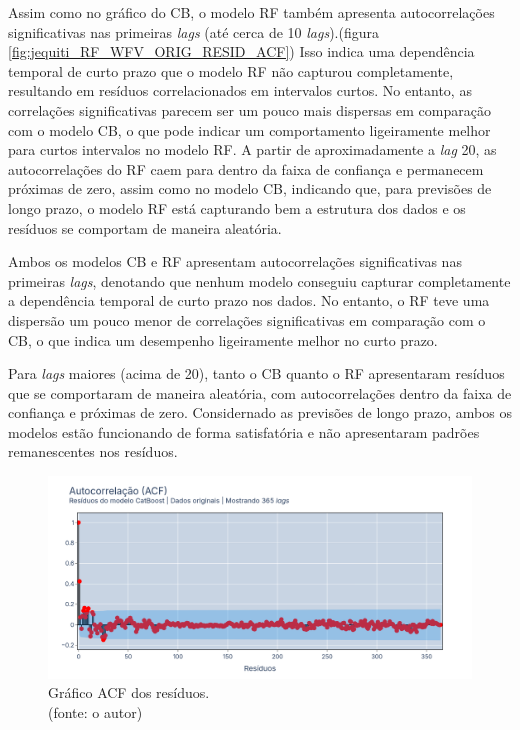 Assim como no gráfico do CB, o modelo RF também apresenta autocorrelações significativas nas primeiras \textit{lags} (até cerca de 10 \textit{lags}).(figura \ref{fig:jequiti_RF_WFV_ORIG_RESID_ACF}) Isso indica uma dependência temporal de curto prazo que o modelo RF não capturou completamente, resultando em resíduos correlacionados em intervalos curtos. No entanto, as correlações significativas parecem ser um pouco mais dispersas em comparação com o modelo CB, o que pode indicar um comportamento ligeiramente melhor para curtos intervalos no modelo RF. A partir de aproximadamente a \textit{lag} 20, as autocorrelações do RF caem para dentro da faixa de confiança e permanecem próximas de zero, assim como no modelo CB, indicando que, para previsões de longo prazo, o modelo RF está capturando bem a estrutura dos dados e os resíduos se comportam de maneira aleatória.

Ambos os modelos CB e RF apresentam autocorrelações significativas nas primeiras \textit{lags}, denotando que nenhum modelo conseguiu capturar completamente a dependência temporal de curto prazo nos dados. No entanto, o RF teve uma dispersão um pouco menor de correlações significativas em comparação com o CB, o que indica um desempenho ligeiramente melhor no curto prazo.

Para \textit{lags} maiores (acima de 20), tanto o CB quanto o RF apresentaram resíduos que se comportaram de maneira aleatória, com autocorrelações dentro da faixa de confiança e próximas de zero. Considernado as previsões de longo prazo, ambos os modelos estão funcionando de forma satisfatória e não apresentaram padrões remanescentes nos resíduos.

\begin{figure}[!h]
\centering
\includegraphics[scale=0.33]{Figuras/jequiti/resultados/CB_WFV_ORIG_RESID_ACF.png}
\caption{Gráfico ACF dos resíduos.\\(fonte: o autor)}
\label{fig:jequiti_CB_WFV_ORIG_RESID_ACF}
\end{figure}

